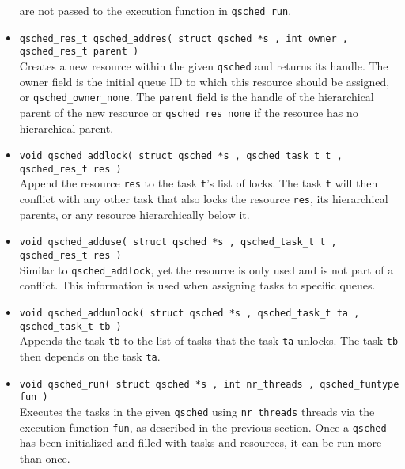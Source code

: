 \documentclass[preprint]{elsarticle}
\begin{document}
\begin{itemize}
        are not passed to the execution function in {\tt qsched\_run}.
        \vspace{1mm}
    \item {\tt qsched\_res\_t qsched\_addres( struct qsched *s , int owner , qsched\_res\_t parent )} \\
        Creates a new resource within the given {\tt qsched} and returns
        its handle.
        The owner field is the initial queue ID to which this resource
        should be assigned, or {\tt qsched\_owner\_none}.
        The {\tt parent} field is the handle of the hierarchical parent of
        the new resource or {\tt qsched\_res\_none} if the resource
        has no hierarchical parent.
        \vspace{1mm}
    \item {\tt void qsched\_addlock( struct qsched *s , qsched\_task\_t t , qsched\_res\_t res )} \\
        Append the resource {\tt res} to the task {\tt t}'s list of
        locks.
        The task {\tt t} will then conflict with any other task that
        also locks the resource {\tt res}, its hierarchical parents, or
        any resource hierarchically below it.
        \vspace{1mm}
    \item {\tt void qsched\_adduse( struct qsched *s , qsched\_task\_t t , qsched\_res\_t res )} \\
        Similar to {\tt qsched\_addlock}, yet the resource is only used and
        is not part of a conflict.
        This information is used when assigning tasks to specific queues.
        \vspace{1mm}
    \item {\tt void qsched\_addunlock( struct qsched *s , qsched\_task\_t ta , qsched\_task\_t tb )} \\
        Appends the task {\tt tb} to the list of tasks that the task {\tt ta}
        unlocks.
        The task {\tt tb} then depends on the task {\tt ta}.
        \vspace{1mm}
    \item {\tt void qsched\_run( struct qsched *s , int nr\_threads , qsched\_funtype fun )} \\
        Executes the tasks in the given {\tt qsched} using {\tt nr\_threads}
        threads via the execution function {\tt fun}, as described in the
        previous section.
        Once a {\tt qsched} has been initialized and filled with
        tasks and resources, it can be run more than once.
        \vspace{1mm}
\end{itemize}
\end{document}
